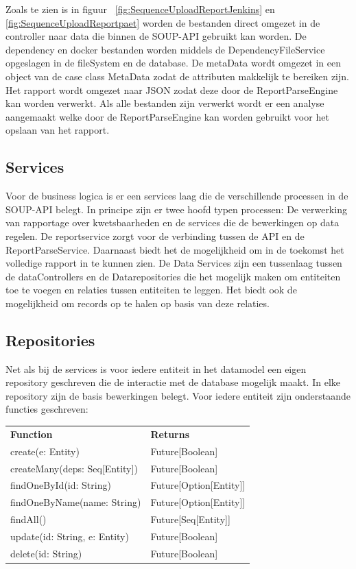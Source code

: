 Zoals te zien is in figuur ~\ref{fig:SequenceUploadReportJenkins} en \ref{fig:SequenceUploadReportpaet} worden de bestanden direct omgezet in de controller naar data die binnen de SOUP-API gebruikt kan worden. De dependency en docker bestanden worden middels de DependencyFileService opgeslagen in de fileSystem en de database. De metaData wordt omgezet in een object van de case class MetaData zodat de attributen makkelijk te bereiken zijn. Het rapport wordt omgezet naar JSON zodat deze door de ReportParseEngine kan worden verwerkt. Als alle bestanden zijn verwerkt wordt er een analyse aangemaakt welke door de ReportParseEngine kan worden gebruikt voor het opslaan van het rapport.

\subsection{Services}\label{subsec:Services}
Voor de business logica is er een services laag die de verschillende processen in de SOUP-API belegt. In principe zijn er twee hoofd typen processen: De verwerking van rapportage over kwetsbaarheden en de services die de bewerkingen op data regelen.
De reportservice zorgt voor de verbinding tussen de API en de ReportParseService. Daarnaast biedt het de mogelijkheid om in de toekomst het volledige rapport in te kunnen zien.
De Data Services zijn een tussenlaag tussen de dataControllers en de Datarepositories die het mogelijk maken om entiteiten toe te voegen en relaties tussen entiteiten te leggen. Het biedt ook de mogelijkheid om records op te halen op basis van deze relaties.

\subsection{Repositories}\label{subsec:repositories}
Net als bij de services is voor iedere entiteit in het datamodel een eigen repository geschreven die de interactie met de database mogelijk maakt. In elke repository zijn de basis bewerkingen belegt. Voor iedere entiteit zijn onderstaande functies geschreven:

\begin{tabular}{ll}
    \textbf{Function} & \textbf{Returns}\\
    create(e: Entity) & Future[Boolean] \\
    createMany(deps: Seq[Entity])& Future[Boolean]\\
    findOneById(id: String) & Future[Option[Entity]]\\
    findOneByName(name: String) & Future[Option[Entity]]\\
    findAll() & Future[Seq[Entity]] \\
    update(id: String, e: Entity) & Future[Boolean]\\
    delete(id: String) & Future[Boolean] \\
\end{tabular} \\

